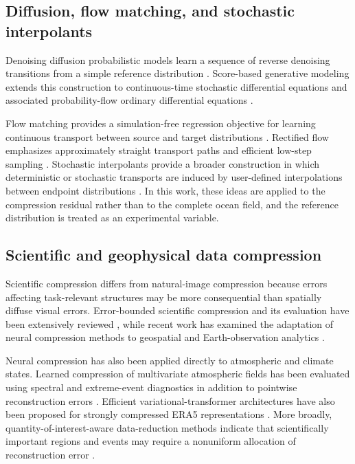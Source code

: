 \documentclass[11pt]{article}
\begin{document}
\subsection{Diffusion, flow matching, and stochastic interpolants}

Denoising diffusion probabilistic models learn a sequence of reverse denoising transitions from a simple reference distribution \cite{ho2020denoising}. Score-based generative modeling extends this construction to continuous-time stochastic differential equations and associated probability-flow ordinary differential equations \cite{song2020score}.

Flow matching provides a simulation-free regression objective for learning continuous transport between source and target distributions \cite{lipman2022flow}. Rectified flow emphasizes approximately straight transport paths and efficient low-step sampling \cite{liu2022flow}. Stochastic interpolants provide a broader construction in which deterministic or stochastic transports are induced by user-defined interpolations between endpoint distributions \cite{albergo2022building}. In this work, these ideas are applied to the compression residual rather than to the complete ocean field, and the reference distribution is treated as an experimental variable.

\subsection{Scientific and geophysical data compression}

Scientific compression differs from natural-image compression because errors affecting task-relevant structures may be more consequential than spatially diffuse visual errors. Error-bounded scientific compression and its evaluation have been extensively reviewed \cite{di2025survey}, while recent work has examined the adaptation of neural compression methods to geospatial and Earth-observation analytics \cite{gomes2025lossy}.

Neural compression has also been applied directly to atmospheric and climate states. Learned compression of multivariate atmospheric fields has been evaluated using spectral and extreme-event diagnostics in addition to pointwise reconstruction errors \cite{mirowski2024neural}. Efficient variational-transformer architectures have also been proposed for strongly compressed ERA5 representations \cite{han2024cra5}. More broadly, quantity-of-interest-aware data-reduction methods indicate that scientifically important regions and events may require a nonuniform allocation of reconstruction error \cite{li2025machine}.
\end{document}
